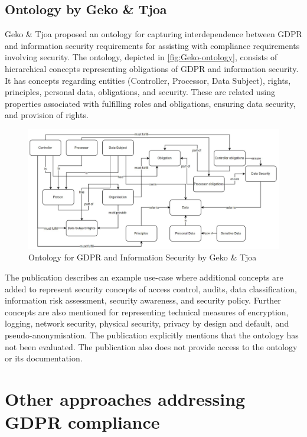 \subsection*{Ontology by Geko \& Tjoa}
Geko \& Tjoa \cite{geko_ontology_2018} proposed an ontology for capturing interdependence between GDPR and information security requirements for assisting with compliance requirements involving security.
The ontology, depicted in \autoref{fig:Geko-ontology}, consists of hierarchical concepts representing obligations of GDPR and information security.
It has concepts regarding entities (Controller, Processor, Data Subject), rights, principles, personal data, obligations, and security. These are related using properties associated with fulfilling roles and obligations, ensuring data security, and provision of rights.
\begin{figure}[htbp]
    \centering
    \includegraphics[width=0.8\linewidth]{img/Geko_ontology.png}
    \caption{Ontology for GDPR and Information Security by Geko \& Tjoa \cite{geko_ontology_2018}}
    \label{fig:Geko-ontology}
\end{figure}

The publication describes an example use-case where additional concepts are added to represent security concepts of access control, audits, data classification, information risk assessment, security awareness, and security policy. Further concepts are also mentioned for representing technical measures of encryption, logging, network security, physical security, privacy by design and default, and pseudo-anonymisation.
The publication explicitly mentions that the ontology has not been evaluated. The publication also does not provide access to the ontology or its documentation.

\section{Other approaches addressing GDPR compliance}\label{sec:sota:gdpr-other}

